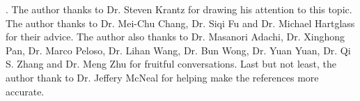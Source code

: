 \documentclass[11pt]{article}
\theoremstyle{plain} \numberwithin{equation}{section}
\theoremstyle{definition}
\begin{document}
	\bigskip
	\bigskip
	. The author thanks to Dr. Steven Krantz for drawing his attention to this topic. The author thanks to Dr. Mei-Chu Chang, Dr. Siqi Fu and Dr. Michael Hartglass for their advice. The author also thanks to Dr. Masanori Adachi, Dr. Xinghong Pan, Dr. Marco Peloso, Dr. Lihan Wang, Dr. Bun Wong, Dr. Yuan Yuan, Dr. Qi S. Zhang and Dr. Meng Zhu for fruitful conversations. Last but not least, the author thank to Dr. Jeffery McNeal for helping make the references more accurate.
	
	\printbibliography
	
\end{document}
